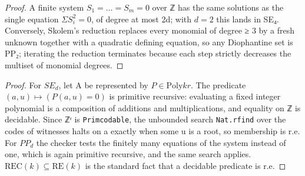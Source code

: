 \begin{proof}
A finite system $S_{1} = … = S_{m} = 0$ over ℤ has the same solutions as the single equation $ΣS_{i}^{2} = 0$, of degree at most 2d; with $d = 2$ this lands in SE₄. Conversely, Skolem's reduction replaces every monomial of degree ≥ 3 by a fresh unknown together with a quadratic defining equation, so any Diophantine set is PP₂; iterating the reduction terminates because each step strictly decreases the multiset of monomial degrees.

\end{proof}
\begin{proof}
For $SE_{d}$, let A be represented by $P ∈ \mathrm{Poly} k r$. The predicate $(a, u) ↦ (P(a,u) = 0)$ is primitive recursive: evaluating a fixed integer polynomial is a composition of additions and multiplications, and equality on ℤ is decidable. Since ℤʳ is \texttt{Primcodable}, the unbounded search \texttt{Nat.\allowbreak{}rfind} over the codes of witnesses halts on a exactly when some u is a root, so membership is r.e. For $PP_{d}$ the checker tests the finitely many equations of the system instead of one, which is again primitive recursive, and the same search applies. $\mathrm{REC}(k) ⊆ \mathrm{RE}(k)$ is the standard fact that a decidable predicate is r.e.
\end{proof}
